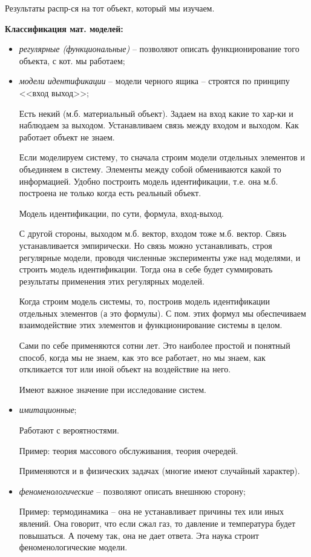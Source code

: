 Результаты распр-ся на тот объект, который мы изучаем.


\textbf{Классификация мат. моделей:}

\begin{itemize}[label*=--]
	\item \textit{регулярные (функциональные)} -- позволяют описать функционирование того объекта, с кот. мы работаем;
	
	\item \textit{модели идентификации} -- модели черного ящика -- строятся по принципу <<вход выход>>;
	
	Есть некий (м.б. материальный объект). Задаем на вход какие то хар-ки и наблюдаем за выходом. Устанавливаем связь между входом и выходом. Как работает объект не знаем.
	
	Если моделируем систему, то сначала строим модели отдельных элементов и объединяем в систему. Элементы между собой обмениваются какой то информацией. Удобно построить модель идентификации, т.е. она м.б. построена не только когда есть реальный объект.
	
	Модель идентификации, по сути, формула, вход-выход.
	
	С другой стороны, выходом м.б. вектор, входом тоже м.б. вектор. Связь устанавливается эмпирически. Но связь можно устанавливать, строя регулярные модели, проводя численные эксперименты уже над моделями, и строить модель идентификации. Тогда она в себе будет суммировать результаты применения этих регулярных моделей. 
	
	Когда строим модель системы, то, построив модель идентификации отдельных элементов (а это формулы). С пом. этих формул мы обеспечиваем взаимодействие этих элементов и функционирование системы в целом. 
	
	Сами по себе применяются сотни лет. Это наиболее простой и понятный способ, когда мы не знаем, как это все работает, но мы знаем, как откликается тот или иной объект на воздействие на него. 
	
	Имеют важное значение при исследование систем.
	
	\item \textit{имитационные};
	
	Работают с вероятностями. 
	
	Пример: теория массового обслуживания, теория очередей.
	
	Применяются и в физических задачах (многие имеют случайный характер). 
	
	\item \textit{феноменологические} -- позволяют описать внешнюю сторону;
	
	Пример: термодинамика -- она не устанавливает причины тех или иных явлений. Она говорит, что если сжал газ, то давление и температура будет повышаться. А почему так, она не дает ответа. Эта наука строит феноменологические модели. 
	
\end{itemize}


